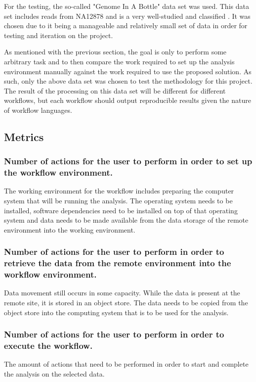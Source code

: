 For the testing, the so-called "Genome In A Bottle" data set was used. This data set includes reads from NA12878 and is a very well-studied and classified \parencite{paajanen2017critical}. It was chosen due to it being a manageable and relatively small set of data in order for testing and iteration on the project. 

As mentioned with the previous section, the goal is only to perform some arbitrary task and to then compare the work required to set up the analysis environment manually against the work required to use the proposed solution. As such, only the above data set was chosen to test the methodology for this project. The result of the processing on this data set will be different for different workflows, but each workflow should output reproducible results given the nature of workflow languages.

\subsection{Metrics}

\subsubsection{Number of actions for the user to perform in order to set up the workflow environment.}
The working environment for the workflow includes preparing the computer system that will be running the analysis. The operating system needs to be installed, software dependencies need to be installed on top of that operating system and data needs to be made available from the data storage of the remote environment into the working environment.

\subsubsection{Number of actions for the user to perform in order to retrieve the data from the remote environment into the workflow environment.}
Data movement still occurs in some capacity. While the data is present at the remote site, it is stored in an object store. The data needs to be copied from the object store into the computing system that is to be used for the analysis.

\subsubsection{Number of actions for the user to perform in order to execute the workflow.}
The amount of actions that need to be performed in order to start and complete the analysis on the selected data.


